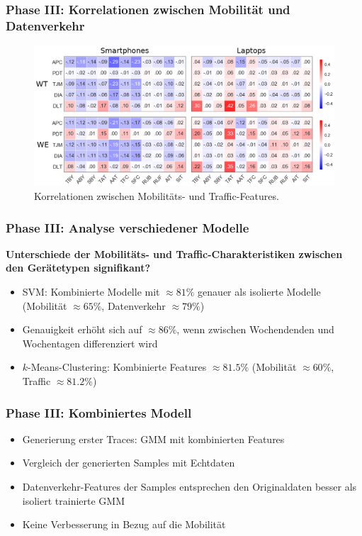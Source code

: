 \documentclass{beamer}
\begin{document}
\begin{frame}
  \frametitle{Phase III: Korrelationen zwischen Mobilität und Datenverkehr}
  \begin{figure}
    \centering
    \includegraphics[width=\textwidth]{images/correlations.png}
    \caption*{Korrelationen zwischen Mobilitäts- und Traffic-Features.}
  \end{figure}
\end{frame}

\begin{frame}
  \frametitle{Phase III: Analyse verschiedener Modelle}
  \textbf{Unterschiede der Mobilitäts- und Traffic-Charakteristiken zwischen den Gerätetypen signifikant?}
  \begin{itemize}
    \item SVM: Kombinierte Modelle mit $\approx 81\%$ genauer als isolierte Modelle (Mobilität $\approx 65 \%$, Datenverkehr $\approx 79 \%$)
    \item Genauigkeit erhöht sich auf $\approx 86\%$, wenn zwischen Wochendenden und Wochentagen differenziert wird    
    \item $k$-Means-Clustering: Kombinierte Features $\approx81.5 \%$ (Mobilität $\approx 60 \%$, Traffic $\approx 81.2 \%$)
  \end{itemize}
\end{frame}

\begin{frame}
  \frametitle{Phase III: Kombiniertes Modell}
  \begin{itemize}
    \item Generierung erster Traces: GMM mit kombinierten Features
    \item Vergleich der generierten Samples mit Echtdaten
    \item Datenverkehr-Features der Samples entsprechen den Originaldaten besser als isoliert trainierte GMM
    \item Keine Verbesserung in Bezug auf die Mobilität
  \end{itemize}
\end{frame}
\end{document}
